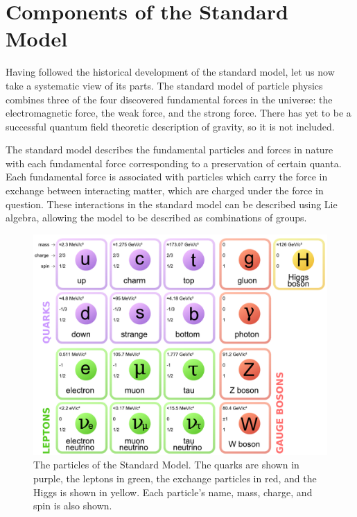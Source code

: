 \section{Components of the Standard Model}
Having followed the historical development of the standard model, let us now take a systematic view of its parts.
The standard model of particle physics combines three of the four discovered fundamental forces in the universe: the electromagnetic force, the weak force, and the strong force.  There has yet to be a successful quantum field theoretic description of gravity, so it is not included.

The standard model describes the fundamental particles and forces in nature with each fundamental force corresponding to a preservation of certain quanta. Each fundamental force is associated with particles which carry the force in exchange between interacting matter, which are charged under the force in question. These interactions in the standard model can be described using Lie algebra, allowing the model to be described as combinations of groups.

\begin{figure}[!btp]
    \centering
    \includegraphics[width=\textwidth]{figures/standard_model.pdf}
    \caption[Diagram of the particles in the standard model.]
       {The particles of the Standard Model.  The quarks are shown in purple, the leptons in green, the exchange particles in red, and the Higgs is shown in yellow.  Each particle's name, mass, charge, and spin is also shown.}
    \label{fig:ParticleTable}
\end{figure}

